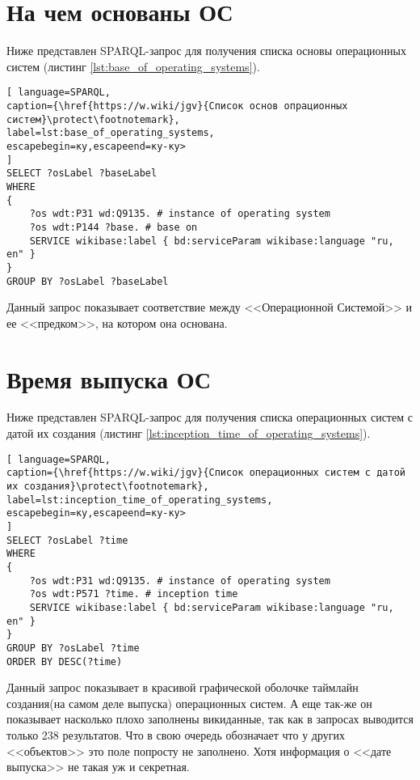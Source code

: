 \section{На чем основаны ОС}
Ниже представлен SPARQL-запрос для получения списка основы операционных систем (листинг \ref{lst:base_of_operating_systems}).

\begin{lstlisting}[ language=SPARQL, 
caption={\href{https://w.wiki/jgv}{Список основ опрационных систем}\protect\footnotemark},
label=lst:base_of_operating_systems, 
escapebegin=ку,escapeend=ку-ку>
]
SELECT ?osLabel ?baseLabel
WHERE
{
	?os wdt:P31 wd:Q9135. # instance of operating system
	?os wdt:P144 ?base. # base on 
	SERVICE wikibase:label { bd:serviceParam wikibase:language "ru, en" }
}
GROUP BY ?osLabel ?baseLabel
\end{lstlisting}

Данный запрос показывает соответствие между <<Операционной Системой>> и ее <<предком>>, на котором она основана.


\section{Время выпуска ОС}
Ниже представлен SPARQL-запрос для получения списка операционных систем с датой их создания (листинг \ref{lst:inception_time_of_operating_systems}).
\begin{lstlisting}[ language=SPARQL, 
caption={\href{https://w.wiki/jgv}{Список операционных систем с датой их создания}\protect\footnotemark},
label=lst:inception_time_of_operating_systems, 
escapebegin=ку,escapeend=ку-ку>
]
SELECT ?osLabel ?time
WHERE
{
	?os wdt:P31 wd:Q9135. # instance of operating system
	?os wdt:P571 ?time. # inception time
	SERVICE wikibase:label { bd:serviceParam wikibase:language "ru, en" }
}
GROUP BY ?osLabel ?time
ORDER BY DESC(?time)
\end{lstlisting}

Данный запрос показывает в красивой графической оболочке таймлайн создания(на самом деле выпуска) операционных систем. А еще так-же он показывает насколько плохо заполнены викиданные, так как в запросах выводится только 238 результатов. Что в свою очередь обозначает что у других <<объектов>> это поле попросту не заполнено. Хотя информация о <<дате выпуска>> не такая уж и секретная.

